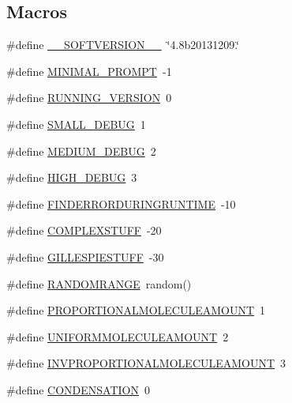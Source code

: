 \subsection*{Macros}
\begin{DoxyCompactItemize}
\item 
\#define \hyperlink{a00072_aab38659c2fe462437b89a1e85e619dc7}{\-\_\-\-\_\-\-S\-O\-F\-T\-V\-E\-R\-S\-I\-O\-N\-\_\-\-\_\-}~\char`\"{}4.\-8b20131209.\char`\"{}
\item 
\#define \hyperlink{a00072_a972f6696f10f8159f336357f003493b6}{M\-I\-N\-I\-M\-A\-L\-\_\-\-P\-R\-O\-M\-P\-T}~-\/1
\item 
\#define \hyperlink{a00072_a72244054b9e2e45fe85cbef84bd42904}{R\-U\-N\-N\-I\-N\-G\-\_\-\-V\-E\-R\-S\-I\-O\-N}~0
\item 
\#define \hyperlink{a00072_a6f7711b8195edb3c3541c153ebcb4bfa}{S\-M\-A\-L\-L\-\_\-\-D\-E\-B\-U\-G}~1
\item 
\#define \hyperlink{a00072_ab0ead5a0a8c59ad5f4d9fcf0be28a5d7}{M\-E\-D\-I\-U\-M\-\_\-\-D\-E\-B\-U\-G}~2
\item 
\#define \hyperlink{a00072_ac2a71f467524d5299cbff5df96be638a}{H\-I\-G\-H\-\_\-\-D\-E\-B\-U\-G}~3
\item 
\#define \hyperlink{a00072_a0934dca9b46dc1ce8ccae606a6511f63}{F\-I\-N\-D\-E\-R\-R\-O\-R\-D\-U\-R\-I\-N\-G\-R\-U\-N\-T\-I\-M\-E}~-\/10
\item 
\#define \hyperlink{a00072_a186bfb39322832c790ce5403bc04330d}{C\-O\-M\-P\-L\-E\-X\-S\-T\-U\-F\-F}~-\/20
\item 
\#define \hyperlink{a00072_a27f5d30679c0e8877ba9246eb1a48ff4}{G\-I\-L\-L\-E\-S\-P\-I\-E\-S\-T\-U\-F\-F}~-\/30
\item 
\#define \hyperlink{a00072_a4cb4f6978b0d938a0523bd6946e7609d}{R\-A\-N\-D\-O\-M\-R\-A\-N\-G\-E}~random()
\item 
\#define \hyperlink{a00072_a79c4b6317fd327fd5a62d65036481a25}{P\-R\-O\-P\-O\-R\-T\-I\-O\-N\-A\-L\-M\-O\-L\-E\-C\-U\-L\-E\-A\-M\-O\-U\-N\-T}~1
\item 
\#define \hyperlink{a00072_a6236cb136896f6bcbc6694d394e8aca3}{U\-N\-I\-F\-O\-R\-M\-M\-O\-L\-E\-C\-U\-L\-E\-A\-M\-O\-U\-N\-T}~2
\item 
\#define \hyperlink{a00072_ae36555e0be87892071c6340cc0fa43ad}{I\-N\-V\-P\-R\-O\-P\-O\-R\-T\-I\-O\-N\-A\-L\-M\-O\-L\-E\-C\-U\-L\-E\-A\-M\-O\-U\-N\-T}~3
\item 
\#define \hyperlink{a00072_aeeaf3e004dff03f70f94e0cf7d623b3c}{C\-O\-N\-D\-E\-N\-S\-A\-T\-I\-O\-N}~0
\item 

\end{DoxyCompactItemize}
